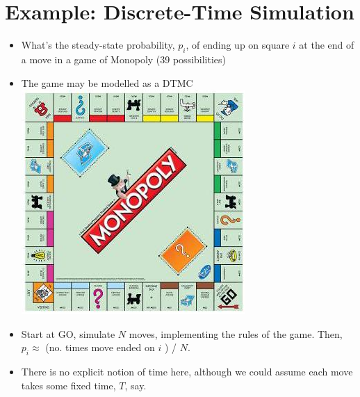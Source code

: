 \documentclass[10pt]{article}
\begin{document}
\section*{Example: Discrete-Time Simulation}
\begin{itemize}
  \item What's the steady-state probability, $p_{i}$, of ending up on square $i$ at the end of a move in a game of Monopoly (39 possibilities)
  \item The game may be modelled as a DTMC\\
\includegraphics[max width=\textwidth, center]{2025_05_12_520db7cd238ba7b44f0fg-04}
  \item Start at GO, simulate $N$ moves, implementing the rules of the game. Then, $p_{i} \approx$ (no. times move ended on $i$ ) / $N$.
  \item There is no explicit notion of time here, although we could assume each move takes some fixed time, $T$, say.
\end{itemize}
\end{document}
